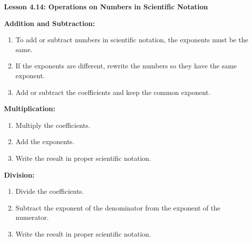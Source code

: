\begin{center}
\textbf{Lesson 4.14: Operations on Numbers in Scientific Notation}
\end{center}

\vspace*{-1.5ex}

\noindent \textbf{Addition and Subtraction:}
    \begin{enumerate}
        \item To add or subtract numbers in scientific notation, the exponents must be the same.  
        \item If the exponents are different, rewrite the numbers so they have the same exponent.  
        \item Add or subtract the coefficients and keep the common exponent.  
     \end{enumerate}

\noindent  \textbf{Multiplication:}
    \begin{enumerate}
        \item Multiply the coefficients.  
        \item Add the exponents.  
        \item Write the result in proper scientific notation.  
    \end{enumerate}

\noindent \textbf{Division:}
    \begin{enumerate}
        \item Divide the coefficients.  
        \item Subtract the exponent of the denominator from the exponent of the numerator.  
        \item Write the result in proper scientific notation.  
    \end{enumerate}
